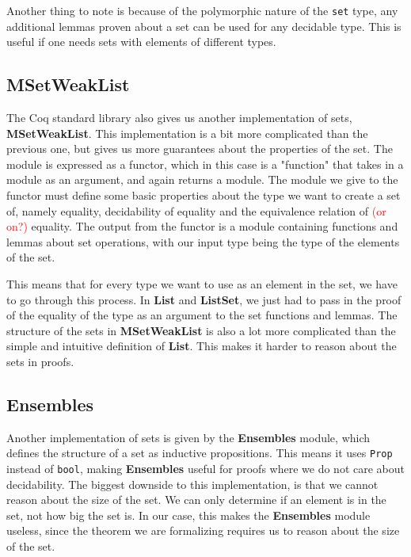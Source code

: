 Another thing to note is because of the polymorphic nature of the \lstinline{set} type, any additional lemmas proven about a set can be
used for any decidable type. This is useful if one needs sets with elements of different types.

\subsection{MSetWeakList}

The Coq standard library also gives us another implementation of sets, \textbf{MSetWeakList}.
This implementation is a bit more complicated than the previous one,
but gives us more guarantees about the properties of the set.
The module is expressed as a functor, which in this case is a "function" that takes in a module as an argument, and again returns a module.
The module we give to the functor must define some basic properties about the type we want to create a set of,
namely equality, decidability of equality and the equivalence relation of \textcolor{red}{(or on?)} equality.
The output from the functor is a module containing functions and lemmas about set operations,
with our input type being the type of the elements of the set.

This means that for every type we want to use as an element in the set, we have to go through this process.
In \textbf{List} and \textbf{ListSet}, we just had to pass in the proof of the equality of the type as an argument to the set functions and lemmas.
The structure of the sets in \textbf{MSetWeakList} is also a lot more complicated than the simple and intuitive definition of \textbf{List}.
This makes it harder to reason about the sets in proofs.

\subsection{Ensembles}

Another implementation of sets is given by the \textbf{Ensembles} module, which defines the structure of a set as inductive propositions.
This means it uses \lstinline{Prop} instead of \lstinline{bool},
making \textbf{Ensembles} useful for proofs where we do not care about decidability.
The biggest downside to this implementation, is that we cannot reason about the size of the set.
We can only determine if an element is in the set, not how big the set is.
In our case, this makes the \textbf{Ensembles} module useless, since the theorem we are formalizing requires us to reason about the
size of the set.



